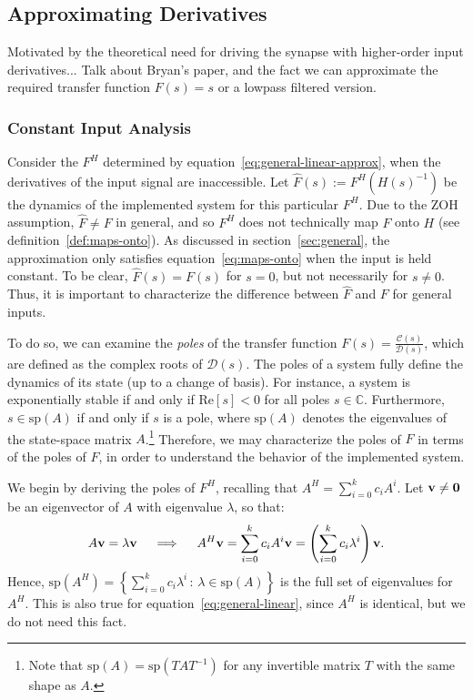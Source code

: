 \subsection{Approximating Derivatives}

Motivated by the theoretical need for driving the synapse with higher-order input derivatives...
Talk about Bryan's paper, and the fact we can approximate the required transfer function $F(s) = s$ or a lowpass filtered version.

\subsubsection{Constant Input Analysis}

Consider the $F^H$ determined by equation~\ref{eq:general-linear-approx}, when the derivatives of the input signal are inaccessible.
Let $\hat{F}(s) := F^{H}(H(s)^{-1})$ be the dynamics of the implemented system for this particular $F^H$.
Due to the ZOH assumption, $\hat{F} \ne F$ in general, and so $F^H$ does not technically map $F$ onto $H$ (see definition~\ref{def:maps-onto}).
As discussed in section~\ref{sec:general}, the approximation only satisfies equation~\ref{eq:maps-onto} when the input is held constant.
To be clear, $\hat{F}(s) = F(s)$ for $s = 0$, but not necessarily for $s \ne 0$.
Thus, it is important to characterize the difference between $\hat{F}$ and $F$ for general inputs.

To do so, we can examine the \emph{poles} of the transfer function $F(s) = \frac{\mathcal{C}(s)}{\mathcal{D}(s)}$, which are defined as the complex roots of $\mathcal{D}(s)$.
The poles of a system fully define the dynamics of its state (up to a change of basis).
For instance, a system is exponentially stable if and only if $\text{Re} \left[ s \right] < 0$ for all poles $s \in \mathbb{C}$.
Furthermore, $s \in \text{sp}(A)$ if and only if $s$ is a pole, where $\text{sp}(A)$ denotes the eigenvalues of the state-space matrix $A$.\footnote{
Note that $\text{sp}(A) = \text{sp}(TAT^{-1})$ for any invertible matrix $T$ with the same shape as $A$.
}
Therefore, we may characterize the poles of $\hat{F}$ in terms of the poles of $F$, in order to understand the behavior of the implemented system.

We begin by deriving the poles of $F^H$, recalling that $A^H = \sum_{i=0}^k c_i A^i$.
Let $\mathbf{v} \ne \mathbf{0}$ be an eigenvector of $A$ with eigenvalue $\lambda$, %
so that:
\begin{align*}
A\mathbf{v} = \lambda \mathbf{v} \quad \implies \quad A^H \mathbf{v} = \sum_{i=0}^k c_i A^i \mathbf{v} = \left( \sum_{i=0}^k c_i \lambda^i \right) \mathbf{v} \text{.}
\end{align*}
Hence, $\text{sp}\left(A^H \right) = \left\{  \sum_{i=0}^k c_i \lambda^i \,:\, \lambda \in \text{sp}(A) \right\}$ is the full set of eigenvalues for $A^H$.
This is also true for equation~\ref{eq:general-linear}, since $A^H$ is identical, but we do not need this fact.

